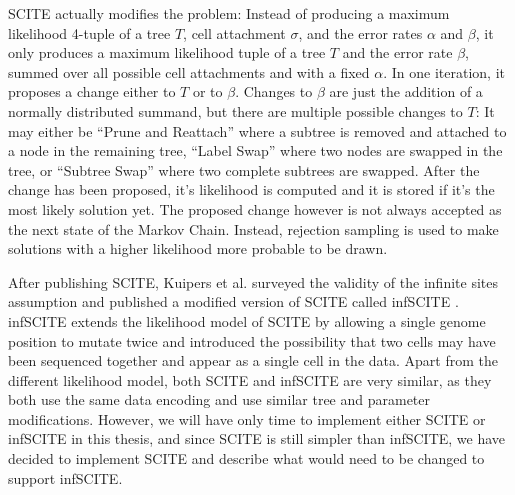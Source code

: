 \ac{SCITE} actually modifies the problem: Instead of producing a maximum likelihood 4-tuple of a tree $T$, cell attachment $\sigma$, and the error rates $\alpha$ and $\beta$, it only produces a maximum likelihood tuple of a tree $T$ and the error rate $\beta$, summed over all possible cell attachments and with a fixed $\alpha$. In one iteration, it proposes a change either to $T$ or to $\beta$. Changes to $\beta$ are just the addition of a normally distributed summand, but there are multiple possible changes to $T$: It may either be ``Prune and Reattach'' where a subtree is removed and attached to a node in the remaining tree, ``Label Swap'' where two nodes are swapped in the tree, or ``Subtree Swap'' where two complete subtrees are swapped. After the change has been proposed, it's likelihood is computed and it is stored if it's the most likely solution yet. The proposed change however is not always accepted as the next state of the Markov Chain. Instead, rejection sampling is used to make solutions with a higher likelihood more probable to be drawn.

After publishing \ac{SCITE}, Kuipers et al. surveyed the validity of the infinite sites assumption and published a modified version of \ac{SCITE} called \ac{infSCITE} \cite{kuipers2017single}. \ac{infSCITE} extends the likelihood model of \ac{SCITE} by allowing a single genome position to mutate twice and introduced the possibility that two cells may have been sequenced together and appear as a single cell in the data. Apart from the different likelihood model, both \ac{SCITE} and \ac{infSCITE} are very similar, as they both use the same data encoding and use similar tree and parameter modifications. However, we will have only time to implement either \ac{SCITE} or \ac{infSCITE} in this thesis, and since \ac{SCITE} is still simpler than \ac{infSCITE}, we have decided to implement \ac{SCITE} and describe what would need to be changed to support \ac{infSCITE}.
